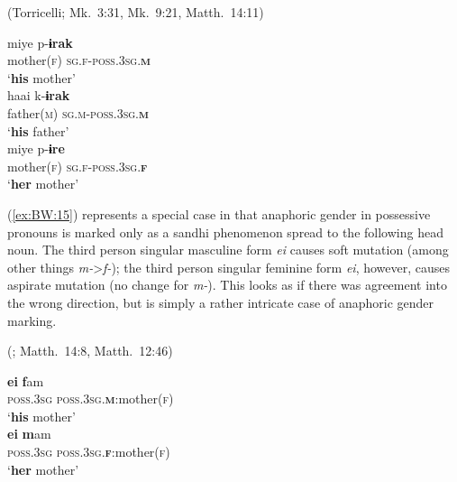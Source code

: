 \documentclass[output=collectionpaper]{langsci/langscibook}
\begin{document}
\ea\label{ex:BW:14}
 (Torricelli; Mk.~3:31, Mk.~9:21, Matth.~14:11)\\
\begin{xlist}
\ex
\gll miye 	p-\textbf{ɨrak}\\
mother(\textsc{f})	{\textrightarrow\textsc{sg.f-poss.3sg.\textbf{m}}}\\
\glt ‘\textbf{his} mother’\\
\ex
\gll
haai 	k-\textbf{ɨrak}\\
father(\textsc{m})	{\textrightarrow\textsc{sg.m-poss.3sg.\textbf{m}}}\\
\glt ‘\textbf{his} father’\\
\ex
\gll miye 	p-\textbf{ɨre}\\
mother(\textsc{f})	{\textrightarrow\textsc{sg.f-poss.3sg.\textbf{f}}}\\
\glt ‘\textbf{her} mother’\\
\end{xlist}
\z

 (\ref{ex:BW:15}) represents a special case in that anaphoric gender in possessive pronouns is marked only as a sandhi phenomenon spread to the following head noun. The third person singular masculine form \textit{ei} causes soft mutation (among other things \textit{m-}>\textit{f-}); the third person singular feminine form \textit{ei}, however, causes aspirate mutation (no change for \textit{m-}). This looks as if there was agreement into the wrong direction, but is simply a rather intricate case of anaphoric gender marking.

\ea\label{ex:BW:15}
 (; Matth.~14:8, Matth.~12:46)\\
\begin{xlist}
\ex
\gll \textbf{ei} 	\textbf{f}am\\
\textsc{poss.3sg}	\textsc{poss.3sg.\textbf{m}}:mother(\textsc{f})\\
\glt ‘\textbf{his} mother’\\
\ex
\gll \textbf{ei} 	\textbf{m}am\\
\textsc{poss.3sg}	\textsc{poss.3sg.\textbf{f}}:mother(\textsc{f})\\
\glt ‘\textbf{her} mother’\\
\end{xlist}
\z
\end{document}

